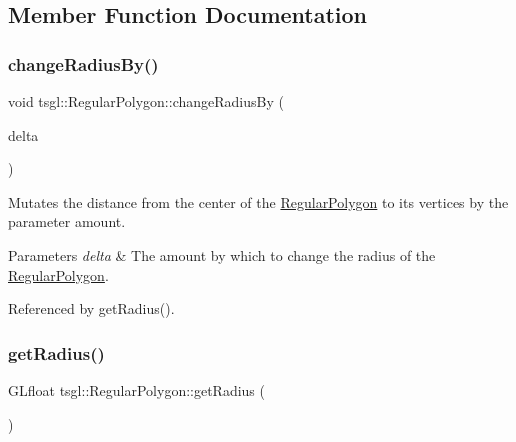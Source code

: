 \subsection{Member Function Documentation}
\mbox{\label{classtsgl_1_1_regular_polygon_af115ff2fbff6075dc965af51f7507bc9}} 
\subsubsection{\texorpdfstring{change\+Radius\+By()}{changeRadiusBy()}}
{\footnotesize\ttfamily void tsgl\+::\+Regular\+Polygon\+::change\+Radius\+By (\begin{DoxyParamCaption}\item[{G\+Lfloat}]{delta }\end{DoxyParamCaption})}



Mutates the distance from the center of the \hyperlink{classtsgl_1_1_regular_polygon}{Regular\+Polygon} to its vertices by the parameter amount. 


\begin{DoxyParams}{Parameters}
{\em delta} & The amount by which to change the radius of the \hyperlink{classtsgl_1_1_regular_polygon}{Regular\+Polygon}. \\
\hline
\end{DoxyParams}


Referenced by get\+Radius().

\mbox{\label{classtsgl_1_1_regular_polygon_a97e19ebc76f1f22f5fee795d4d633aa0}} 
\subsubsection{\texorpdfstring{get\+Radius()}{getRadius()}}
{\footnotesize\ttfamily G\+Lfloat tsgl\+::\+Regular\+Polygon\+::get\+Radius (\begin{DoxyParamCaption}{ }\end{DoxyParamCaption})\hspace{0.3cm}{\ttfamily [inline]}}



